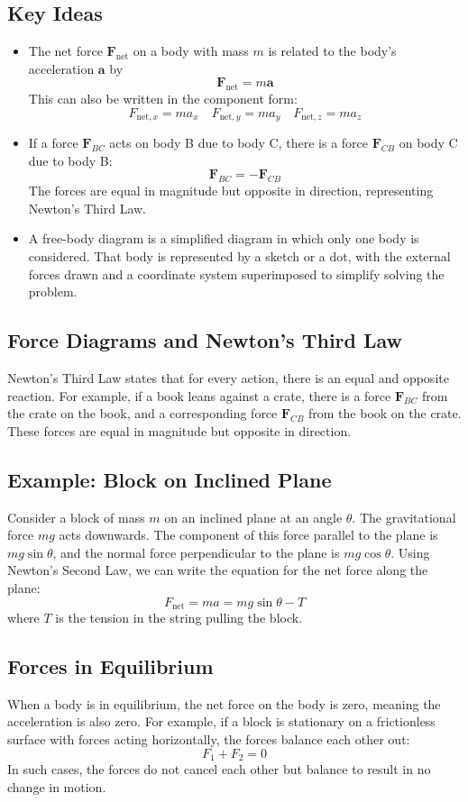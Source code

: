 \documentclass{article}
\begin{document}
\subsection*{Key Ideas}
\begin{itemize}
    \item The net force $\mathbf{F}_{\text{net}}$ on a body with mass $m$ is related to the body’s acceleration $\mathbf{a}$ by
    \[
    \mathbf{F}_{\text{net}} = m \mathbf{a}
    \]
    This can also be written in the component form:
    \[
    F_{\text{net},x} = m a_x \quad F_{\text{net},y} = m a_y \quad F_{\text{net},z} = m a_z
    \]

    \item If a force $\mathbf{F}_{BC}$ acts on body B due to body C, there is a force $\mathbf{F}_{CB}$ on body C due to body B:
    \[
    \mathbf{F}_{BC} = -\mathbf{F}_{CB}
    \]
    The forces are equal in magnitude but opposite in direction, representing Newton's Third Law.

    \item A free-body diagram is a simplified diagram in which only one body is considered. That body is represented by a sketch or a dot, with the external forces drawn and a coordinate system superimposed to simplify solving the problem.
\end{itemize}

\subsection*{Force Diagrams and Newton’s Third Law}
Newton’s Third Law states that for every action, there is an equal and opposite reaction. For example, if a book leans against a crate, there is a force $\mathbf{F}_{BC}$ from the crate on the book, and a corresponding force $\mathbf{F}_{CB}$ from the book on the crate. These forces are equal in magnitude but opposite in direction.

\subsection*{Example: Block on Inclined Plane}
Consider a block of mass $m$ on an inclined plane at an angle $\theta$. The gravitational force $mg$ acts downwards. The component of this force parallel to the plane is $mg \sin \theta$, and the normal force perpendicular to the plane is $mg \cos \theta$. Using Newton's Second Law, we can write the equation for the net force along the plane:
\[
F_{\text{net}} = m a = mg \sin \theta - T
\]
where $T$ is the tension in the string pulling the block.

\subsection*{Forces in Equilibrium}
When a body is in equilibrium, the net force on the body is zero, meaning the acceleration is also zero. For example, if a block is stationary on a frictionless surface with forces acting horizontally, the forces balance each other out:
\[
F_1 + F_2 = 0
\]
In such cases, the forces do not cancel each other but balance to result in no change in motion.
\end{document}
